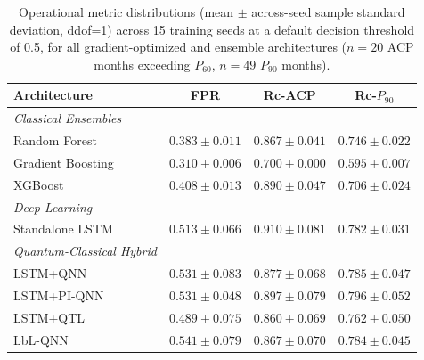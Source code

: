 \begin{table}[htbp]
\centering
\caption{Operational metric distributions (mean $\pm$ across-seed sample standard deviation, ddof=1) across 15 training seeds at a default decision threshold of 0.5, for all gradient-optimized and ensemble architectures ($n=20$ ACP months exceeding $P_{60}$, $n=49$ $P_{90}$ months).}
\label{tab:operational_multiseed}
\begin{tabular}{lccc}
\toprule
\textbf{Architecture} & \textbf{FPR} & \textbf{Rc-ACP} & \textbf{Rc-$P_{90}$} \\
\midrule
\textit{Classical Ensembles}\\
Random Forest & $0.383 \pm 0.011$ & $0.867 \pm 0.041$ & $0.746 \pm 0.022$ \\
Gradient Boosting & $0.310 \pm 0.006$ & $0.700 \pm 0.000$ & $0.595 \pm 0.007$ \\
XGBoost & $0.408 \pm 0.013$ & $0.890 \pm 0.047$ & $0.706 \pm 0.024$ \\
\midrule
\textit{Deep Learning}\\
Standalone LSTM & $0.513 \pm 0.066$ & $0.910 \pm 0.081$ & $0.782 \pm 0.031$ \\
\midrule
\textit{Quantum-Classical Hybrid}\\
LSTM+QNN & $0.531 \pm 0.083$ & $0.877 \pm 0.068$ & $0.785 \pm 0.047$ \\
LSTM+PI-QNN & $0.531 \pm 0.048$ & $0.897 \pm 0.079$ & $0.796 \pm 0.052$ \\
LSTM+QTL & $0.489 \pm 0.075$ & $0.860 \pm 0.069$ & $0.762 \pm 0.050$ \\
LbL-QNN & $0.541 \pm 0.079$ & $0.867 \pm 0.070$ & $0.784 \pm 0.045$ \\
\bottomrule
\end{tabular}
\end{table}
